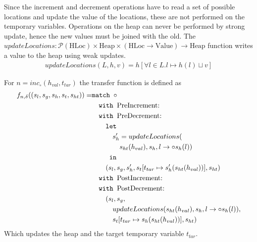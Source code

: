 Since the increment and decrement operations have to read a set of possible locations and update the value of the locations, these are not performed on the temporary variables. Operations on the heap can never be performed by strong update, hence the new values must be joined with the old. The $updateLocations:\mathcal{P}(\text{HLoc}) \times \text{Heap} \times (\text{HLoc}\rightarrow\text{Value})\rightarrow \text{Heap}$ function writes a value to the heap using weak updates.
\begin{align}
updateLocations(L,h, v) = h[\forall l \in L. l \mapsto h(l)\sqcup v]
\end{align}

For $n = \mathit{inc}_\circ(h_{val},t_{tar})$ the transfer function is defined as
\begin{align}
f_{n,\delta}((s_l, s_g, s_h, s_t, s_{ht})) =     & \texttt{match }\circ\notag\\
                                & \quad\texttt{with }\text{PreIncrement}\text{: } \notag\\
                                & \quad\texttt{with }\text{PreDecrement}\text{: } \notag\\
                                & \quad\quad\texttt{let } \notag\\
                                & \quad\quad\quad s_h' = updateLocations(\notag\\
                                & \quad\quad\quad\quad s_{ht}(h_{val}), s_h, l\rightarrow \circ s_h(l))\notag\\
                                & \quad\quad  \texttt{ in }\notag\\
                                & \quad\quad (s_l, s_g, s_h',s_t[t_{tar}\mapsto s_h'(s_{ht}(h_{val}))], s_{ht})\notag\\
                                & \quad\texttt{with }\text{PostIncrement}\text{: } \notag\\
                                & \quad\texttt{with }\text{PostDecrement}\text{: } \notag\\
                                & \quad\quad (s_l, s_g, \notag\\
                                & \quad\quad\quad updateLocations(s_{ht}(h_{val}), s_h, l\rightarrow \circ s_h(l)),\notag\\
                                & \quad\quad\quad s_t[t_{tar}\mapsto s_h(s_{ht}(h_{val}))], s_{ht})
\end{align}
Which updates the heap and the target temporary variable $t_{tar}$.
